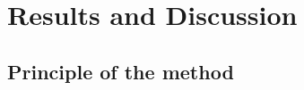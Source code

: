 \documentclass{biophys-new}
\begin{document}
%
%
%
%
%
%


\section*{Results and Discussion}

%


\subsection*{Principle of the method}
\end{document}
